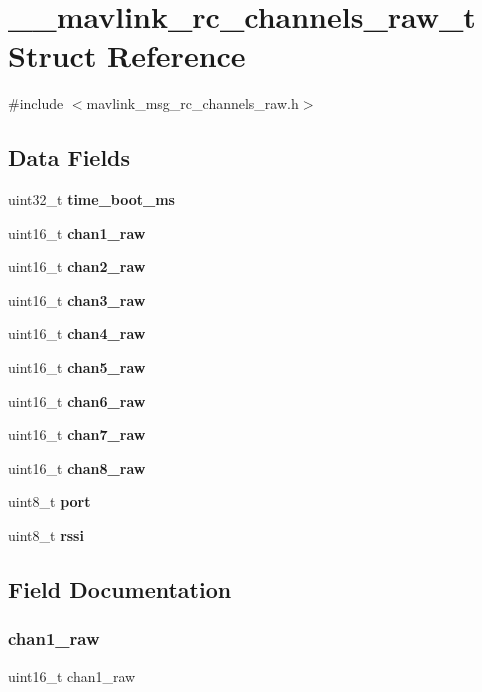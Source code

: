 \section{\+\_\+\+\_\+mavlink\+\_\+rc\+\_\+channels\+\_\+raw\+\_\+t Struct Reference}
\label{struct____mavlink__rc__channels__raw__t}


{\ttfamily \#include $<$mavlink\+\_\+msg\+\_\+rc\+\_\+channels\+\_\+raw.\+h$>$}

\subsection*{Data Fields}
\begin{DoxyCompactItemize}
\item 
uint32\+\_\+t \textbf{ time\+\_\+boot\+\_\+ms}
\item 
uint16\+\_\+t \textbf{ chan1\+\_\+raw}
\item 
uint16\+\_\+t \textbf{ chan2\+\_\+raw}
\item 
uint16\+\_\+t \textbf{ chan3\+\_\+raw}
\item 
uint16\+\_\+t \textbf{ chan4\+\_\+raw}
\item 
uint16\+\_\+t \textbf{ chan5\+\_\+raw}
\item 
uint16\+\_\+t \textbf{ chan6\+\_\+raw}
\item 
uint16\+\_\+t \textbf{ chan7\+\_\+raw}
\item 
uint16\+\_\+t \textbf{ chan8\+\_\+raw}
\item 
uint8\+\_\+t \textbf{ port}
\item 
uint8\+\_\+t \textbf{ rssi}
\end{DoxyCompactItemize}


\subsection{Field Documentation}
\mbox{\label{struct____mavlink__rc__channels__raw__t_aca17d85a81b611116663950e842e0827}} 
\subsubsection{chan1\+\_\+raw}
{\footnotesize\ttfamily uint16\+\_\+t chan1\+\_\+raw}

